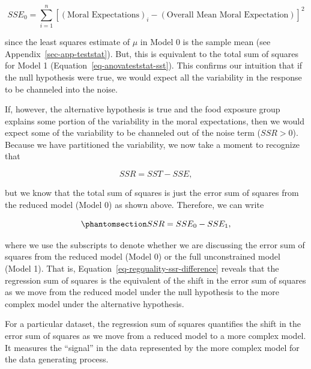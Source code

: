 \documentclass[
  letterpaper,
  DIV=11,
  numbers=noendperiod]{scrreprt}
\theoremstyle{plain}
\theoremstyle{definition}
\theoremstyle{definition}
\theoremstyle{remark}
\begin{document}
\[SSE_0 = \sum_{i=1}^{n} \left[(\text{Moral Expectations})_i - (\text{Overall Mean Moral Expectation})\right]^2\]

since the least squares estimate of \(\mu\) in Model 0 is the sample
mean (see Appendix~\ref{sec-app-teststat}). But, this is equivalent to
the total sum of squares for Model 1
(Equation~\ref{eq-anovateststat-sst}). This confirms our intuition that
if the null hypothesis were true, we would expect all the variability in
the response to be channeled into the noise.

If, however, the alternative hypothesis is true and the food exposure
group explains some portion of the variability in the moral
expectations, then we would expect some of the variability to be
channeled out of the noise term (\(SSR > 0\)). Because we have
partitioned the variability, we now take a moment to recognize that

\[SSR = SST - SSE,\]

but we know that the total sum of squares is just the error sum of
squares from the reduced model (Model 0) as shown above. Therefore, we
can write

\begin{equation}\phantomsection\label{eq-anovateststat-ssr-difference}{SSR = SSE_0 - SSE_1,}\end{equation}

where we use the subscripts to denote whether we are discussing the
error sum of squares from the reduced model (Model 0) or the full
unconstrained model (Model 1). That is,
Equation~\ref{eq-regquality-ssr-difference} reveals that the regression
sum of squares is the equivalent of the shift in the error sum of
squares as we move from the reduced model under the null hypothesis to
the more complex model under the alternative hypothesis.

\begin{tcolorbox}[enhanced jigsaw, breakable, titlerule=0mm, colframe=quarto-callout-tip-color-frame, bottomtitle=1mm, opacityback=0, rightrule=.15mm, toptitle=1mm, arc=.35mm, bottomrule=.15mm, left=2mm, title=\textcolor{quarto-callout-tip-color}{\faLightbulb}\hspace{0.5em}{Big Idea}, leftrule=.75mm, coltitle=black, toprule=.15mm, colbacktitle=quarto-callout-tip-color!10!white, colback=white, opacitybacktitle=0.6]

For a particular dataset, the regression sum of squares quantifies the
shift in the error sum of squares as we move from a reduced model to a
more complex model. It measures the ``signal'' in the data represented
by the more complex model for the data generating process.

\end{tcolorbox}
\end{document}
